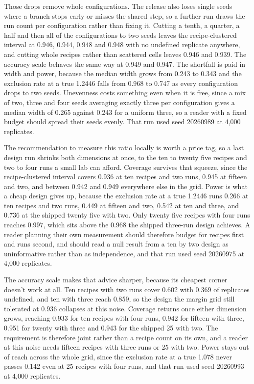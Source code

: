 Those drops remove whole configurations. The release also loses single seeds where a branch stops early or misses the shared step, so a further run draws the run count per configuration rather than fixing it. Cutting a tenth, a quarter, a half and then all of the configurations to two seeds leaves the recipe-clustered interval at 0.946, 0.944, 0.948 and 0.948 with no undefined replicate anywhere, and cutting whole recipes rather than scattered cells leaves 0.946 and 0.939. The accuracy scale behaves the same way at 0.949 and 0.947. The shortfall is paid in width and power, because the median width grows from 0.243 to 0.343 and the exclusion rate at a true 1.2446 falls from 0.968 to 0.747 as every configuration drops to two seeds. Unevenness costs something even when it is free, since a mix of two, three and four seeds averaging exactly three per configuration gives a median width of 0.265 against 0.243 for a uniform three, so a reader with a fixed budget should spread their seeds evenly. That run used seed 20260989 at 4,000 replicates.

The recommendation to measure this ratio locally is worth a price tag, so a last design run shrinks both dimensions at once, to the ten to twenty five recipes and two to four runs a small lab can afford. Coverage survives that squeeze, since the recipe-clustered interval covers 0.936 at ten recipes and two runs, 0.945 at fifteen and two, and between 0.942 and 0.949 everywhere else in the grid. Power is what a cheap design gives up, because the exclusion rate at a true 1.2446 runs 0.266 at ten recipes and two runs, 0.449 at fifteen and two, 0.542 at ten and three, and 0.736 at the shipped twenty five with two. Only twenty five recipes with four runs reaches 0.997, which sits above the 0.968 the shipped three-run design achieves. A reader planning their own measurement should therefore budget for recipes first and runs second, and should read a null result from a ten by two design as uninformative rather than as independence, and that run used seed 20260975 at 4,000 replicates.

The accuracy scale makes that advice sharper, because its cheapest corner doesn't work at all. Ten recipes with two runs cover 0.602 with 0.369 of replicates undefined, and ten with three reach 0.859, so the design the margin grid still tolerated at 0.936 collapses at this noise. Coverage returns once either dimension grows, reaching 0.933 for ten recipes with four runs, 0.942 for fifteen with three, 0.951 for twenty with three and 0.943 for the shipped 25 with two. The requirement is therefore joint rather than a recipe count on its own, and a reader at this noise needs fifteen recipes with three runs or 25 with two. Power stays out of reach across the whole grid, since the exclusion rate at a true 1.078 never passes 0.142 even at 25 recipes with four runs, and that run used seed 20260993 at 4,000 replicates.

